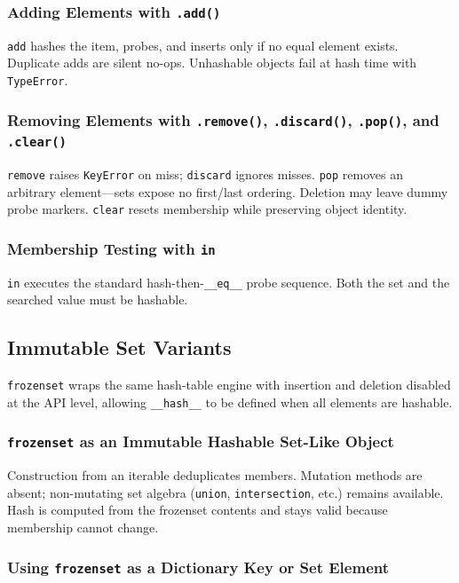 \documentclass[a4paper,twoside]{report}
\begin{document}
\subsubsection{Adding Elements with \texttt{.add()}}

\texttt{add} hashes the item, probes, and inserts only if no equal element exists. Duplicate adds are silent no-ops. Unhashable objects fail at hash time with \texttt{TypeError}.

\subsubsection{Removing Elements with \texttt{.remove()}, \texttt{.discard()}, \texttt{.pop()}, and \texttt{.clear()}}

\texttt{remove} raises \texttt{KeyError} on miss; \texttt{discard} ignores misses. \texttt{pop} removes an arbitrary element---sets expose no first/last ordering. Deletion may leave dummy probe markers. \texttt{clear} resets membership while preserving object identity.

\subsubsection{Membership Testing with \texttt{in}}

\texttt{in} executes the standard hash-then-\texttt{\_\_eq\_\_} probe sequence. Both the set and the searched value must be hashable.


\subsection{Immutable Set Variants}

\texttt{frozenset} wraps the same hash-table engine with insertion and deletion disabled at the API level, allowing \texttt{\_\_hash\_\_} to be defined when all elements are hashable.

\subsubsection{\texttt{frozenset} as an Immutable Hashable Set-Like Object}

Construction from an iterable deduplicates members. Mutation methods are absent; non-mutating set algebra (\texttt{union}, \texttt{intersection}, etc.) remains available. Hash is computed from the frozenset contents and stays valid because membership cannot change.

\subsubsection{Using \texttt{frozenset} as a Dictionary Key or Set Element}
\end{document}
